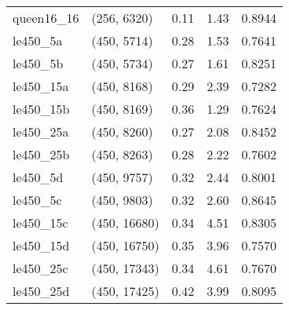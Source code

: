 \begin{tabular}{llrrr}
queen16\_16 &  (256, 6320) &      0.11 &     1.43 & 0.8944 \\
  le450\_5a &  (450, 5714) &      0.28 &     1.53 & 0.7641 \\
  le450\_5b &  (450, 5734) &      0.27 &     1.61 & 0.8251 \\
 le450\_15a &  (450, 8168) &      0.29 &     2.39 & 0.7282 \\
 le450\_15b &  (450, 8169) &      0.36 &     1.29 & 0.7624 \\
 le450\_25a &  (450, 8260) &      0.27 &     2.08 & 0.8452 \\
 le450\_25b &  (450, 8263) &      0.28 &     2.22 & 0.7602 \\
  le450\_5d &  (450, 9757) &      0.32 &     2.44 & 0.8001 \\
  le450\_5c &  (450, 9803) &      0.32 &     2.60 & 0.8645 \\
 le450\_15c & (450, 16680) &      0.34 &     4.51 & 0.8305 \\
 le450\_15d & (450, 16750) &      0.35 &     3.96 & 0.7570 \\
 le450\_25c & (450, 17343) &      0.34 &     4.61 & 0.7670 \\
 le450\_25d & (450, 17425) &      0.42 &     3.99 & 0.8095 \\
\bottomrule
\end{tabular}
